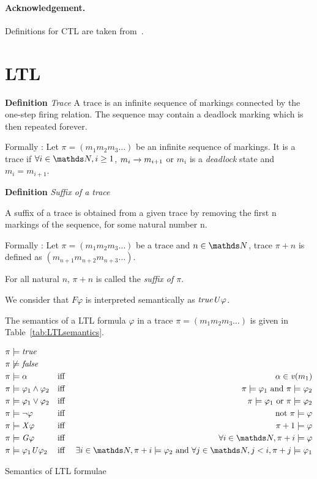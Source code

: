 \documentclass{llncs}
\begin{document}
\paragraph{Acknowledgement.} Definitions for CTL are taken from~\cite{BDJJS:PN:18}.

\section{LTL}



\textbf{Definition}
\emph{Trace}
A trace is an infinite sequence of markings connected by the one-step
firing relation. The sequence may contain a deadlock marking which is
then repeated forever.

Formally : Let $\pi = (m_1 m_2 m_3 \ldots)$ be an infinite sequence of markings.
It is a trace if $\forall i \in \nat,  i \geq 1$, $m_{i} \rtrans m_{i+1}$ or $m_i$ is a \emph{deadlock} state and $m_{i} = m_{i+1}$.
\medskip


\textbf{Definition}
\emph{Suffix of a trace}

A suffix of a trace is obtained from a given trace by removing the first n
markings of the sequence, for some natural number n.

Formally : Let $\pi = (m_1 m_2 m_3 \ldots)$ be a trace and $n \in \nat$, trace $\pi+n$
is defined as $(m_{n+1} m_{n+2} m_{n+3} \ldots)$.

For all natural $n$, $\pi+n$ is called the \emph{suffix of $\pi$}. 
\medskip

We consider that $\mathit{F}\varphi$ is interpreted semantically as $\mathit{true} \mathit{U} \varphi$.

The semantics of a LTL formula $\varphi$ in a trace $\pi = (m_1 m_2 m_3 \ldots)$ 
is given in Table~\ref{tab:LTLsemantics}. 

\begin{table}[htbp]
\raggedbottom
\begin{align*} 
    &\pi \models \true && \\
    &\pi \not\models \false &&  \\
    &\pi \models \alpha && \mbox{iff }& \alpha \in \apeval(m_1) \\
	&\pi \models \varphi_1 \land \varphi_2 &&\mbox{iff } &\pi \models \varphi_1 \mbox{ and } \pi \models \varphi_2 \\
	&\pi \models \varphi_1 \lor \varphi_2 &&\mbox{iff }& \pi \models \varphi_1 \mbox{ or } \pi \models \varphi_2 \\
	&\pi \models \neg \varphi&&\mbox{iff }& \mbox{ not } \pi \models \varphi\\
	&\pi \models \mathit{X}\varphi&& \mbox{iff }& \pi+1 \models \varphi  \\ 
	&\pi \models \mathit{G}\varphi&& \mbox{iff }& \forall i \in \nat, \pi+i \models \varphi  \\ 
	&\pi \models \varphi_1 \mathit{U}\varphi_2&& \mbox{iff } &\exists i \in \nat,  \pi+i \models \varphi_2 \mbox{ and } 
		 \forall j \in \nat, j < i, \pi+j \models \varphi_1   
\end{align*}
\caption{Semantics of LTL formulae} \label{tab:LTLsemantics}
\end{table}
\end{document}
